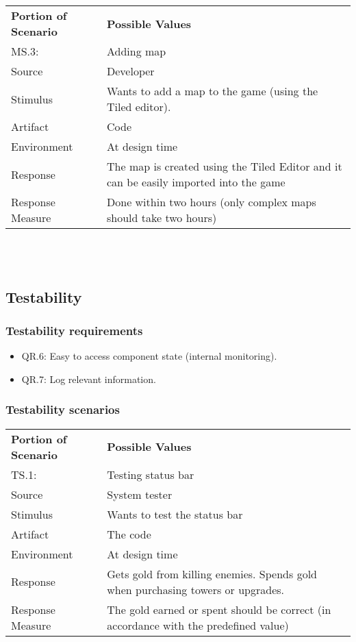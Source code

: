 \documentclass[11pt,a4paper]{article}
\begin{document}
~\\\\

\noindent \begin{tabular}{ l p{7cm} }
\hline
\textbf{Portion of Scenario} & \textbf{Possible Values} \\
MS.3: & Adding map \\
\hline
Source & Developer  \\
Stimulus & Wants to add a map to the game (using the Tiled editor). \\
Artifact & Code \\
Environment & At design time \\
Response & The map is created using the Tiled Editor and it can be easily imported into the game \\
Response Measure & Done within two hours (only complex maps should take two hours)  \\
\hline 
\end{tabular}

~\\\\

\noindent \subsection{Testability}

\subsubsection{Testability requirements}
\begin{itemize}
\item QR.6: Easy to access component state (internal monitoring).
\item QR.7: Log relevant information.
\end{itemize}

\subsubsection{Testability scenarios}
\begin{tabular}{ l p{7cm} }
\hline
\textbf{Portion of Scenario} & \textbf{Possible Values} \\
TS.1: & Testing status bar \\
\hline
Source & System tester \\
Stimulus & Wants to test the status bar \\
Artifact & The code \\
Environment & At design time \\
Response & Gets gold from killing enemies. Spends gold when purchasing towers or upgrades. \\
Response Measure & The gold earned or spent should be correct (in accordance with the predefined value) \\
\hline 
\end{tabular}
\end{document}
